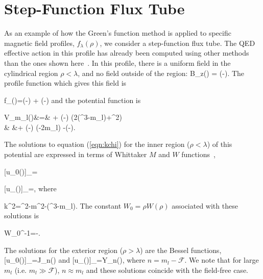 \section{Step-Function Flux Tube}
\label{sec:stepfunc}
As an example of how the Green's function method is applied to specific magnetic field 
profiles, $f_\lambda(\rho)$, we consider a step-function flux tube. The \ac{QED} effective 
action in this profile has already been computed using other 
methods than the ones shown here~\cite{1999PhRvD..60j5019B}. In this 
profile, there is a uniform field in the cylindrical region $\rho < \lambda$, and 
no field outside of the region:
\be 
B_z(\rho) =  \theta(\lambda-\rho).
\ee 
The profile function which gives this field is

\be 
f_\lambda(\rho)=\theta(\lambda-\rho) + \theta(\rho-\lambda)
\ee 
and the potential function is

\ba 
V_{m_l}(\rho)&=& + \theta(\lambda-\rho)
	\left(2(\sigma^3-m_l)+\rho^2\right) \nonumber \\
	& &+ \theta(\rho-\lambda)
	\left(-2m_l\right) -\delta(\lambda-\rho).
\ea 

The solutions to equation (\ref{eqn:kchi}) for the inner region ($\rho < \lambda$) of 
this potential are expressed in terms of 
Whittaker $M$ and $W$ functions~\cite{slater1960confluent},

\be 
\label{eqn:Whit1}
[u_0(\rho)]_{\csubscripts}=
\ee 

\be 
\label{eqn:Whit2}
[u_\infty(\rho)]_{\csubscripts}=,
\ee 
where 

\be
	\label{eqn:kchi}
	k^2=\chi^2-m^2-(\sigma^3-m_l).
\ee
The constant $W_0=\rho W(\rho)$ associated with these solutions is~\cite{slater1960confluent}

\be 
W_0^{-1}=-.
\ee 

The solutions for the exterior region ($\rho > \lambda$) are the Bessel functions,
\be 
\label{eqn:u0ext}
[u_0(\rho)]_{\csubscripts}=J_n(\rho)
\ee 
and
\be 
\label{eqn:uinfext}
[u_\infty(\rho)]_{\csubscripts}=Y_n(\rho),
\ee 
where $n=m_l-\mathcal{F}$.  We note that for large $m_l$ (i.e. $m_l\gg \mathcal{F}$), $n\approx m_l$ and these solutions coincide with the field-free case.

